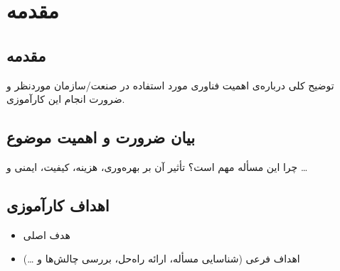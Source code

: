 \documentclass{chamranintern}
\begin{document}
\maketitle

\begin{abstract}
  راهنما: چکیده باید ۲۰۰ تا ۳۰۰ کلمه باشد و موارد زیر را پوشش دهد:
  \begin{itemize}
    \item معرفی کوتاه سازمان/صنعت؛
    \item مسأله‌ی شناسایی‌شده (به‌صورت خیلی مختصر)؛
    \item راه‌حل پیشنهادی؛
    \item مهم‌ترین چالش‌ها و محدودیت‌ها؛
    \item دستاورد اصلی کارآموزی.
  \end{itemize}
\end{abstract}

\tableofcontents

\chapter{مقدمه}
\section{مقدمه}
توضیح کلی درباره‌ی اهمیت فناوری مورد استفاده در صنعت/سازمان موردنظر و ضرورت انجام این کارآموزی.

\section{بیان ضرورت و اهمیت موضوع}
چرا این مسأله مهم است؟ تأثیر آن بر بهره‌وری، هزینه، کیفیت، ایمنی و \ldots

\section{اهداف کارآموزی}
\begin{itemize}
  \item هدف اصلی
  \item اهداف فرعی (شناسایی مسأله، ارائه راه‌حل، بررسی چالش‌ها و \ldots)
\end{itemize}
\end{document}

